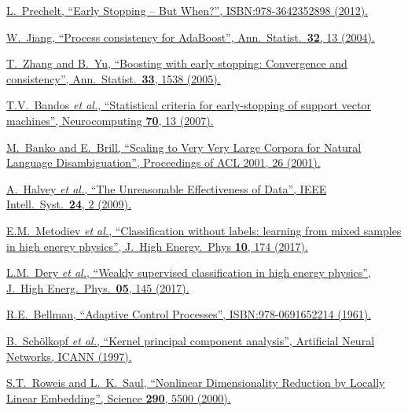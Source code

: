 {\begin{thebibliography}{xxx}
	\href{https://doi.org/10.1007/978-3-642-35289-8_5}{L.~Prechelt, \enquote{Early Stopping -- But When?}, ISBN:978-3642352898 (2012).}

	\href{https://doi.org/10.1214/aos/1079120128}{W.~Jiang, \enquote{Process consistency for AdaBoost}, Ann.\ Statist.\ \textbf{32}, 13 (2004).}

	\href{https://doi.org/10.1214/009053605000000255}{T.~Zhang and B.~Yu, \enquote{Boosting with early stopping: Convergence and consistency}, Ann.\ Statist.\ \textbf{33}, 1538 (2005).}

	\href{https://doi.org/10.1016/j.neucom.2006.12.019}{T.V.~Bandos \textit{et al.}, \enquote{Statistical criteria for early-stopping of support vector machines}, Neurocomputing \textbf{70}, 13 (2007).}

	\href{https://doi.org/10.3115/1073012.1073017}{M.~Banko and E.~Brill, \enquote{Scaling to Very Very Large Corpora for Natural Language Disambiguation}, Proceedings of ACL 2001, 26 (2001).}

	\href{https://doi.org/10.1109/MIS.2009.36}{A.~Halvey \textit{et al.}, \enquote{The Unreasonable Effectiveness of Data}, IEEE Intell.\ Syst.\ \textbf{24}, 2 (2009).}

	\href{https://doi.org/10.1007/JHEP10(2017)174}{E.M.~Metodiev \textit{et al.}, \enquote{Classification without labels: learning from mixed samples in high energy physics}, J.\ High Energy.\ Phys \textbf{10}, 174 (2017).}

	\href{https://doi.org/10.1007/JHEP05(2017)145}{L.M.~Dery \textit{et al.}, \enquote{Weakly supervised classification in high energy physics}, J.\ High Energ.\ Phys.\ \textbf{05}, 145 (2017).}

	\href{https://press.princeton.edu/books/hardcover/9780691652214/adaptive-control-processes}{R.E.~Bellman, \enquote{Adaptive Control Processes}, ISBN:978-0691652214 (1961).}

	\href{https://doi.org/10.1007/BFb0020217}{B.~Schölkopf \textit{et al.}, \enquote{Kernel principal component analysis}, Artificial Neural Networks, ICANN (1997).}

	\href{https://doi.org/10.1126/science.290.5500.2323}{S.T.~Roweis and L.~K.~Saul, \enquote{Nonlinear Dimensionality Reduction by Locally Linear Embedding}, Science \textbf{290}, 5500 (2000).}


\end{thebibliography}}
